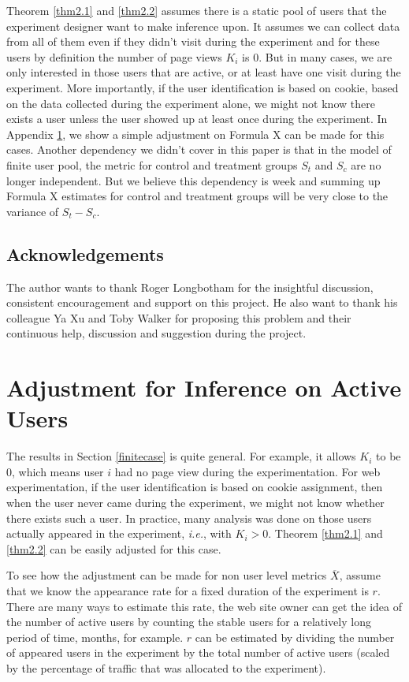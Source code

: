 \documentclass[10pt]{article}
\newcommand{\xbar}{\overline{X}}
\begin{document}
Theorem \ref{thm2.1} and \ref{thm2.2} assumes there is a static pool of users that the experiment designer want to make inference upon. It assumes we can collect data from all of them even if they didn't visit during the experiment and for these users by definition the number of page views $K_i$ is $0$. But in many cases, we are only interested in those users that are active, or at least have one visit during the experiment. More importantly,  if the user identification is based on cookie, based on the data collected during the experiment alone, we might not know there exists a user unless the user showed up at least once during the experiment. In Appendix \ref{practical}, we show a simple adjustment on Formula X can be made for this cases. Another dependency we didn't cover in this paper is that in the model of finite user pool, the metric for control and treatment groups $S_t$ and $S_c$ are no longer independent. But we believe this dependency is week and summing up Formula X estimates for control and treatment groups will be very close to the variance of $S_t-S_c$.


\subsection*{Acknowledgements}
The author wants to thank Roger Longbotham for the insightful discussion, consistent encouragement and support on this project. He also want to thank his colleague Ya Xu and Toby Walker for proposing this problem and their continuous help,  discussion and suggestion during the project.
\appendix
\appendixpage
\section{Adjustment for Inference on Active Users}\label{practical}
The results in Section \ref{finitecase} is quite general. For example, it allows $K_i$ to be 0, which means user $i$ had no page view during the experimentation. For web experimentation, if the user identification is based on cookie assignment, then when the user never came during the experiment, we might not know whether there exists such a user. In practice, many analysis was done on those users actually appeared in the experiment, \emph{i.e.}, with $K_i>0$. Theorem \ref{thm2.1} and \ref{thm2.2} can be easily adjusted for this case.

To see how the adjustment can be made for non user level metrics $\xbar$, assume that we know the appearance rate for a fixed duration of the experiment is $r$. There are many ways to estimate this rate, the web site owner can get the idea of the number of active users by counting the stable users for a relatively long period of time, months, for example. $r$ can be estimated by dividing the number of appeared users in the experiment by the total number of active users (scaled by the percentage of traffic that was allocated to the experiment). 
\end{document}
